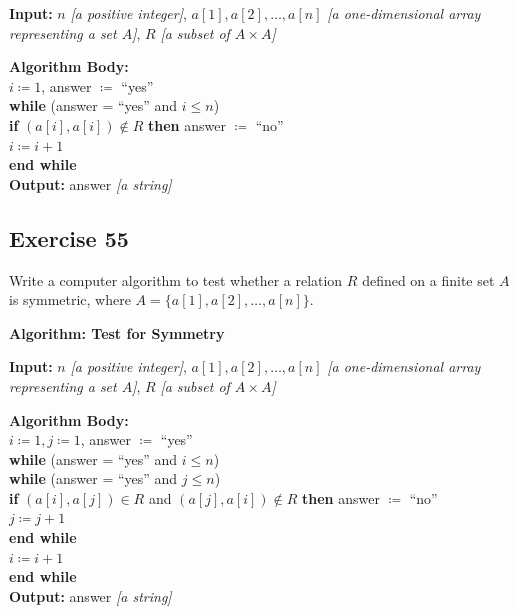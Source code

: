 \documentclass[14pt]{extarticle}
\newcommand{\cy}{\color{cyan}}
\begin{document}
\begin{tcolorbox}[colframe=cyan]
{\bf Input:} $n$ {\it [a positive integer]}, \(a[1], a[2], \ldots, a[n]\) {\it [a one-dimensional array representing a set $A$]}, $R$ {\it [a subset of \(A \times A\)]}

\begin{tabbing}
{\bf Alg}\={\bf orithm Body:} \\
         \> \(i \coloneqq 1\), answer $\coloneqq$ ``yes''\\
         \> {\bf whi}\={\bf le} (answer = ``yes'' and \(i \leq n\)) \\
         \>          \> {\bf if} \((a[i], a[i]) \notin R\) {\bf then} answer \(\coloneqq\) ``no'' \\
         \>          \>  \(i \coloneqq i+1\) \\
         \> {\bf end while} \\
{\bf Output:} answer {\it [a string]}
\end{tabbing}
\end{tcolorbox}

\subsection{Exercise 55}
Write a computer algorithm to test whether a relation \(R\) defined on a finite set \(A\) is symmetric, where 
\(A = \{a[1], a[2], \ldots, a[n]\}\).

\begin{tcolorbox}[colframe=cyan]
{\bf \cy Algorithm: Test for Symmetry} 

{\bf Input:} $n$ {\it [a positive integer]}, \(a[1], a[2], \ldots, a[n]\) {\it [a one-dimensional array representing a set $A$]}, $R$ {\it [a subset of \(A \times A\)]}

\begin{tabbing}
{\bf Alg}\={\bf orithm Body:} \\
         \> \(i \coloneqq 1, j \coloneqq 1\), answer $\coloneqq$ ``yes''\\
         \> {\bf whi}\= {\bf le} (answer = ``yes'' and \(i \leq n\)) \\
         \>          \> {\bf whi}\={\bf le} (answer = ``yes'' and \(j \leq n\)) \\
         \>          \>           \> {\bf if} \((a[i], a[j]) \in R\) and \((a[j], a[i]) \notin R\) {\bf then} 
answer \(\coloneqq\) ``no'' \\
         \>          \>           \> \(j \coloneqq j+1\) \\
         \>          \> {\bf end while} \\
         \>          \>  \(i \coloneqq i+1\) \\
         \> {\bf end while} \\
{\bf Output:} answer {\it [a string]}
\end{tabbing}
\end{tcolorbox}
\end{document}
